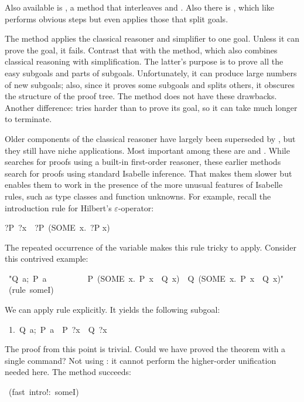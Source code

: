 Also available is , a method
that interleaves  and .  Also there is  ,
which like  performs obvious steps but even applies those that
split goals.

The  method applies the classical
reasoner and simplifier  to one goal. 
Unless it can prove the goal, it fails. Contrast 
that with the  method, which also combines classical reasoning 
with simplification. The latter's purpose is to prove all the 
easy subgoals and parts of subgoals. Unfortunately, it can produce 
large numbers of new subgoals; also, since it proves some subgoals 
and splits others, it obscures the structure of the proof tree. 
The  method does not have these drawbacks. Another 
difference:  tries harder than {} to prove 
its goal, so it can take much longer to terminate.

Older components of the classical reasoner have largely been 
superseded by , but they still have niche applications. 
Most important among these are  and . While  
searches for proofs using a built-in first-order reasoner, these 
earlier methods search for proofs using standard Isabelle inference. 
That makes them slower but enables them to work in the 
presence of the more unusual features of Isabelle rules, such 
as type classes and function unknowns. For example, recall the introduction rule
for Hilbert's $\varepsilon$-operator: 
\begin{isabelle}
?P\ ?x\ \isasymLongrightarrow\ ?P\ (SOME\ x.\ ?P x)
\end{isabelle}
%
The repeated occurrence of the variable  makes this rule tricky 
to apply. Consider this contrived example: 
\begin{isabelle}
\ "\isasymlbrakk Q\ a;\ P\ a\isasymrbrakk\isanewline
\ \ \ \ \ \ \ \ \,\isasymLongrightarrow\ P\ (SOME\ x.\ P\ x\ \isasymand\ Q\ x)\
\isasymand\ Q\ (SOME\ x.\ P\ x\ \isasymand\ Q\ x)"\isanewline
{}\ (rule\ someI)
\end{isabelle}
%
We can apply rule  explicitly.  It yields the 
following subgoal: 
\begin{isabelle}
\ 1.\ \isasymlbrakk Q\ a;\ P\ a\isasymrbrakk\ \isasymLongrightarrow\ P\ ?x\
\isasymand\ Q\ ?x%
\end{isabelle}
The proof from this point is trivial.  Could we have
proved the theorem with a single command? Not using : it
cannot perform  the higher-order unification needed here.  The
\methdx{fast} method succeeds: 
\begin{isabelle}
\ (fast\ intro!:\ someI)
\end{isabelle}

